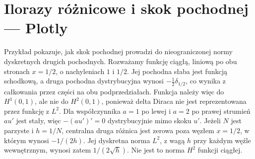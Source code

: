 \section{Ilorazy różnicowe i skok pochodnej — Plotly}
Przykład pokazuje, jak skok pochodnej prowadzi do
nieograniczonej normy dyskretnych drugich pochodnych.
Rozważamy funkcję ciągłą, liniową po obu stronach
$x=1/2$, o nachyleniach $1$ i $1/2$. Jej pochodna
słaba jest funkcją schodkową, a druga pochodna
dystrybucyjna wynosi $-\frac12\delta_{1/2}$, co
wynika z całkowania przez części na obu podprzedziałach.
Funkcja należy więc do $H^1(0,1)$, ale nie do
$H^2(0,1)$, ponieważ delta Diraca nie jest
reprezentowana przez funkcję z $L^2$.
Dla współczynnika $a=1$ po lewej i $a=2$ po prawej
strumień $au'$ jest stały, więc $-(au')'=0$
dystrybucyjnie mimo skoku $u'$.
Jeżeli $N$ jest parzyste i $h=1/N$, centralna
druga różnica jest zerowa poza węzłem $x=1/2$,
w którym wynosi $-1/(2h)$. Jej dyskretna norma
$L^2$, z wagą $h$ przy każdym węźle wewnętrznym,
wynosi zatem $1/(2\sqrt h)$.
Nie jest to norma $H^2$ funkcji ciągłej.
